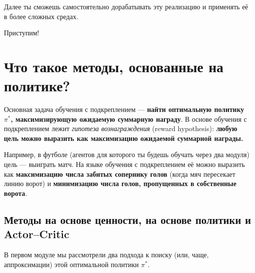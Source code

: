\documentclass[11pt,a4paper]{article}
\begin{document}
Далее ты сможешь самостоятельно дорабатывать эту реализацию и применять её в более сложных средах.


Приступим!

\section{Что такое методы, основанные на политике?}\label{what-are-the-policy-based-methods}

Основная задача обучения с подкреплением --- \textbf{найти оптимальную политику \(\pi^{*}\), максимизирующую ожидаемую суммарную награду}. В основе обучения с подкреплением лежит \emph{гипотеза вознаграждения} (reward hypothesis): \textbf{любую цель можно выразить как максимизацию ожидаемой суммарной награды.}

Например, в футболе (агентов для которого ты будешь обучать через два модуля) цель --- выиграть матч. На языке обучения с подкреплением её можно выразить как \textbf{максимизацию числа забитых сопернику голов} (когда мяч пересекает линию ворот) и \textbf{минимизацию числа голов, пропущенных в собственные ворота}.


\subsection{Методы на основе ценности, на основе политики и Actor--Critic}\label{value-based-policy-based-and-actor-critic-methods}

В первом модуле мы рассмотрели два подхода к поиску (или, чаще, аппроксимации) этой оптимальной политики \(\pi^{*}\).
\end{document}
